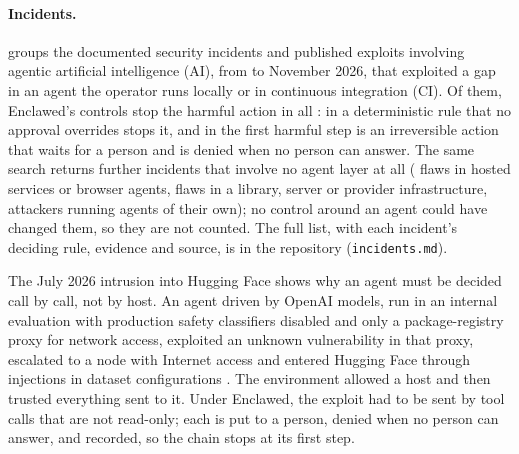 \documentclass[11pt]{article}
\newcommand{\sys}{Enclawed}
\begin{document}
\paragraph{Incidents.}  groups the \IncLayerTotal{}
documented security incidents and published exploits involving agentic
artificial intelligence (AI), from \IncFirstYear{} to November 2026,
that exploited a gap in an agent the operator runs locally or in
continuous integration (CI). Of them, \sys{}'s controls stop the harmful
action in all \IncStopped{}: in \IncLayerRule{} a deterministic rule
that no approval overrides stops it, and in \IncLayerApproval{} the
first harmful step is an irreversible action that waits for a person and
is denied when no person can answer. \IncLayerNotStoppedSentence{} The
same search returns \IncNotAgentLayer{} further incidents that involve
no agent layer at all (\IncGapHosted{} flaws in hosted services or
browser agents, \IncGapDependencyFlaw{} flaws in a library, server or
provider infrastructure, \IncGapAttackerAgent{} attackers running agents
of their own); no control around an agent could have changed them, so
they are not counted. The full list, with each incident's deciding rule,
evidence and source, is in the repository \cite{codenclawed-benchmark}
(\texttt{incidents.md}).

\begin{table}[!htbp]
\centering\footnotesize
\caption{Agentic AI security incidents, \IncFirstYear{} to November 2026,
by the gap exploited, and whether an \sys{} layer around the agent stops
the harmful action (refused by a deterministic rule, or held until a
person approves that one action and refused when no one does).}
\label{tab:incidents}

\end{table}

The July 2026 intrusion into Hugging Face shows why an agent must be
decided call by call, not by host. An agent driven by OpenAI models, run
in an internal evaluation with production safety classifiers disabled
and only a package-registry proxy for network access, exploited an
unknown vulnerability in that proxy, escalated to a node with Internet
access and entered Hugging Face through injections in dataset
configurations \cite{openai2026hf,hf2026timeline}. The environment
allowed a host and then trusted everything sent to it. Under \sys{}, the
exploit had to be sent by tool calls that are not read-only; each is put
to a person, denied when no person can answer, and recorded, so the
chain stops at its first step.
\end{document}
